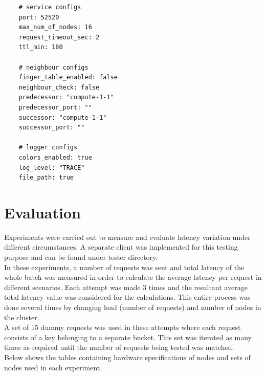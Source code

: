 \documentclass[
    a4paper,
    twocolumn,
]{article}
\begin{document}
\begin{verbatim}
	# service configs
	port: 52520
	max_num_of_nodes: 16
	request_timeout_sec: 2
	ttl_min: 180
	
	# neighbour configs
	finger_table_enabled: false
	neighbour_check: false
	predecessor: "compute-1-1"
	predecessor_port: ""
	successor: "compute-1-1"
	successor_port: ""
	
	# logger configs
	colors_enabled: true
	log_level: "TRACE"
	file_path: true
\end{verbatim}

\section{Evaluation}

Experiments were carried out to measure and evaluate latency variation under different circumstances. A separate client was implemented for this testing purpose and can be found under tester directory. \\

In these experiments, a number of requests was sent and total latency of the whole batch was measured in order to calculate the average latency per request in different scenarios. Each attempt was made 3 times and the resultant average total latency value was considered for the calculations. This entire process was done several times by changing load (number of requests) and number of nodes in the cluster. \\

A set of 15 dummy requests was used in these attempts where each request consists of a key belonging to a separate bucket. This set was iterated as many times as required until the number of requests being tested was matched.\\

Below shows the tables containing hardware specifications of nodes and sets of nodes used in each experiment.
\end{document}
